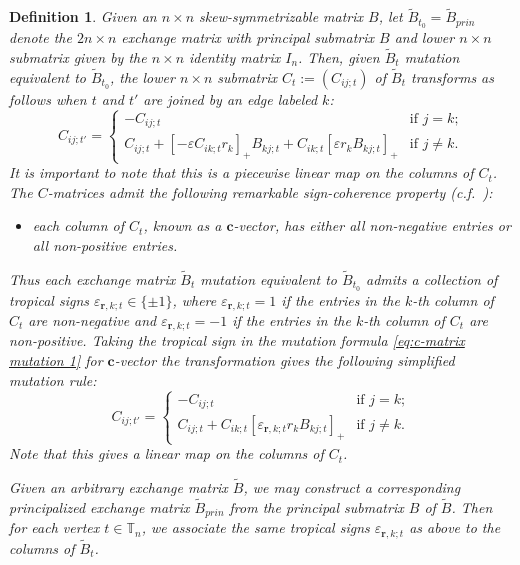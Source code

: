 \documentclass{amsart}
\newtheorem{definition}[theorem]{Definition}
\numberwithin{equation}{section}
\newcommand{\bfc}{\mathbf{c}}
\newcommand{\bfr}{{\boldsymbol{r}}}
\newcommand{\TT}{\mathbb{T}}
\begin{document}
\begin{definition}
  \label{def:tropical signs}
  Given an $n\times n$ skew-symmetrizable matrix $B$, let $\tilde B_{t_0}=\tilde B_{prin}$ denote the $2n\times n$ exchange matrix with principal submatrix $B$ and lower $n\times n$ submatrix given by the $n\times n$ identity matrix $I_n$.
  Then, given $\tilde B_t$ mutation equivalent to $\tilde B_{t_0}$, the lower $n\times n$ submatrix $C_t:=(C_{ij;t})$ of $\tilde B_t$ transforms as follows when $t$ and $t'$ are joined by an edge labeled $k$:
  \begin{equation}
    \label{eq:c-matrix mutation 1}
    C_{ij;t'}=
    \begin{cases}
      -C_{ij;t} & \text{if $j=k$;}\\
      C_{ij;t}+[-\varepsilon C_{ik;t} r_k]_+B_{kj;t}+C_{ik;t}[\varepsilon r_kB_{kj;t}]_+ & \text{if $j\ne k$.}
    \end{cases}
  \end{equation}
  It is important to note that this is a piecewise linear map on the columns of $C_t$.
  The $C$-matrices admit the following remarkable \emph{sign-coherence} property (c.f.\ \cite{FZ07,NZ12,GHKK14,NR16}): 
  \begin{itemize}
    \item each column of $C_t$, known as a \emph{$\bfc$-vector}, has either all non-negative entries or all non-positive entries.
  \end{itemize}
  Thus each exchange matrix $\tilde B_t$ mutation equivalent to $\tilde B_{t_0}$ admits a collection of \emph{tropical signs} $\varepsilon_{\bfr,k;t}\in\{\pm1\}$, where $\varepsilon_{\bfr,k;t}=1$ if the entries in the $k$-th column of $C_t$ are non-negative and $\varepsilon_{\bfr,k;t}=-1$ if the entries in the $k$-th column of $C_t$ are non-positive. 
  Taking the tropical sign in the mutation formula \eqref{eq:c-matrix mutation 1} for $\bfc$-vector the transformation gives the following simplified mutation rule:
  \begin{equation}
    \label{eq:c-matrix mutation 2}
    C_{ij;t'}=
    \begin{cases}
      -C_{ij;t} & \text{if $j=k$;}\\
      C_{ij;t}+C_{ik;t}[\varepsilon_{\bfr,k;t} r_kB_{kj;t}]_+ & \text{if $j\ne k$.}
    \end{cases}
  \end{equation}
  Note that this gives a linear map on the columns of $C_t$.

  Given an arbitrary exchange matrix $\tilde B$, we may construct a corresponding principalized exchange matrix $\tilde B_{prin}$ from the principal submatrix $B$ of $\tilde B$.
  Then for each vertex $t\in\TT_n$, we associate the same tropical signs $\varepsilon_{\bfr,k;t}$ as above to the columns of $\tilde B_t$.
\end{definition}
\end{document}
